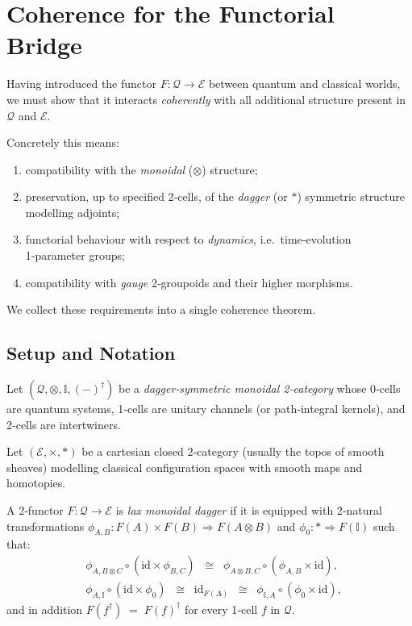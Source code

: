 \section{Coherence for the Functorial Bridge}

Having introduced the functor
\(F\colon\mathcal Q\to\mathcal E\)
between quantum and classical worlds, we must show that it interacts
\emph{coherently} with all additional structure present in
$\mathcal Q$ and $\mathcal E$.  

Concretely this means:
\begin{enumerate}
  \item compatibility with the \emph{monoidal} ($\otimes$) structure;
  \item preservation, up to specified 2‑cells, of the
        \emph{dagger} (or $*$) symmetric structure modelling adjoints;
  \item functorial behaviour with respect to \emph{dynamics}, i.e.\
        time‑evolution 1‑parameter groups;
  \item compatibility with \emph{gauge} 2‑groupoids and their higher
        morphisms.
\end{enumerate}

We collect these requirements into a single coherence theorem.

\vspace{0.5cm}
\subsection{Setup and Notation}

Let
\((\mathcal Q,\otimes,\mathbb I,(-)^{\dagger})\)
be a \emph{dagger‑symmetric monoidal 2‑category}
whose 0‑cells are quantum systems, 1‑cells are
unitary channels (or path‑integral kernels), and 2‑cells are
intertwiners.

Let
\((\mathcal E,\times,\ast)\)
be a cartesian closed 2‑category (usually the topos of smooth
sheaves) modelling classical configuration spaces with smooth maps and
homotopies.

\begin{definition}
A 2‑functor
\(F\colon\mathcal Q\to\mathcal E\)
is \emph{lax monoidal dagger} if it is equipped with 2‑natural
transformations
\(\phi_{A,B}\colon F(A)\times F(B)\Rightarrow F(A\otimes B)\)
and
\(\phi_{0}\colon \ast\Rightarrow F(\mathbb I)\)
such that:
\begin{align}
  \label{eq:pentagon}
  &\phi_{A,B\otimes C}\circ
    (\mathrm{id}\times\phi_{B,C}) \;\;\cong\;\;
    \phi_{A\otimes B,C}\circ(\phi_{A,B}\times\mathrm{id}),\\[4pt]
  \label{eq:unit}
  &\phi_{A,\mathbb I}\circ(\mathrm{id}\times\phi_{0})
    \;\;\cong\;\;
    \mathrm{id}_{F(A)} 
    \;\;\cong\;\;
    \phi_{\mathbb I,A}\circ(\phi_{0}\times\mathrm{id}),
\end{align}
and in addition
\(F(f^{\dagger}) \;=\; F(f)^{\dagger}\)
for every 1‑cell \(f\) in $\mathcal Q$.
\end{definition}

